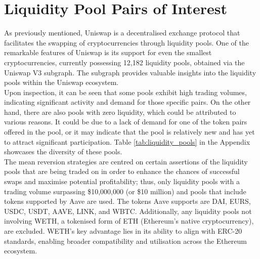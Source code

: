 \section{Liquidity Pool Pairs of Interest}
\label{sec:liquidity-pools}
As previously mentioned, Uniswap is a decentralised exchange protocol that facilitates the swapping of cryptocurrencies through liquidity pools. One of the remarkable features of Uniswap is its support for even the smallest cryptocurrencies, currently possessing 12,182 liquidity pools, obtained via the Uniswap V3 subgraph. The subgraph provides valuable insights into the liquidity pools within the Uniswap ecosystem.
\\[3mm]
Upon inspection, it can be seen that some pools exhibit high trading volumes, indicating significant activity and demand for those specific pairs. On the other hand, there are also pools with zero liquidity, which could be attributed to various reasons. It could be due to a lack of demand for one of the token pairs offered in the pool, or it may indicate that the pool is relatively new and has yet to attract significant participation. Table \ref{tab:liquidity_pools} in the Appendix showcases the diversity of these pools.
\\[3mm]
The mean reversion strategies are centred on certain assertions of the liquidity pools that are being traded on in order to enhance the chances of successful swaps and maximise potential profitability; thus, only liquidity pools with a trading volume surpassing \$10,000,000 (or \$10 million) and pools that include tokens supported by Aave are used. The tokens Aave supports are DAI, EURS, USDC, USDT, AAVE, LINK, and WBTC. Additionally, any liquidity pools not involving WETH, a tokenised form of ETH (Ethereum's native cryptocurrency), are excluded. WETH's key advantage lies in its ability to align with ERC-20 standards, enabling broader compatibility and utilisation across the Ethereum ecosystem.

